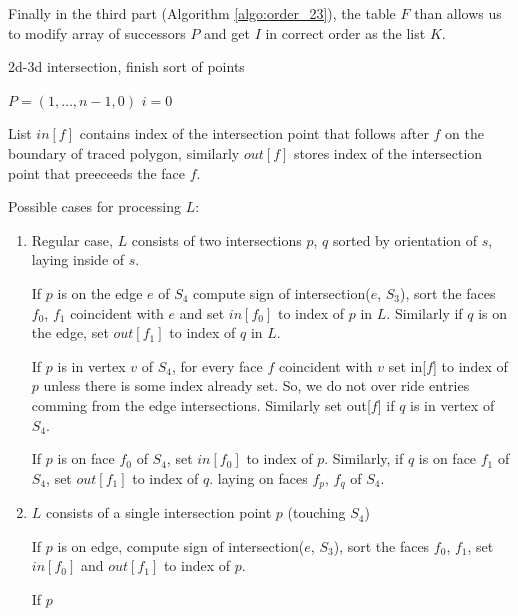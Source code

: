 \documentclass{elsarticle}
\def\abs#1{\left|#1\right|}
\def\abs#1{| #1 |}
\begin{document}
Finally in the third part (Algorithm \ref{algo:order_23}), the table $F$ than allows us to modify array of successors $P$ and get $I$ in correct order as the list $K$.










\begin{algorithm}
  \caption{2d-3d intersection, finish sort of points}  
  \label{algo:order_23}
  
  \DontPrintSemicolon
  $P=(1,\dots, n-1,0)$
  $i=0$\;  
  \lFor{$n=0$ \To $\abs{I}-1$}{
    $K[n]=I[i]$
    $i=P[i]$
  }    
  \label{algo:order_23}
\end{algorithm}

  
 List $in[f]$ contains index of the intersection point that follows after $f$ on the boundary of traced polygon, 
 similarly $out[f]$ stores index of the intersection point that preeceeds the face $f$.

  
Possible cases for processing $L$:
\begin{enumerate}
 \item Regular case, $L$ consists of two intersections $p$, $q$ sorted by orientation of $s$, laying inside of $s$.
 
 If $p$ is on the edge $e$ of $S_4$ compute sign of intersection($e$, $S_3$), sort the faces $f_0$, $f_1$ coincident with $e$
 and set $in[f_0]$ to index of $p$ in $L$. Similarly if $q$ is on the edge, set $out[f_1]$ to index of $q$ in $L$.
 
 If $p$ is in vertex $v$ of $S_4$, for every face $f$ coincident with $v$ set
 in[$f$] to index of $p$ unless there is some index already set. So, we do not over ride
 entries comming from the edge intersections. Similarly set out[$f$] if $q$ is in vertex of $S_4$.
 
 If $p$ is on face $f_0$ of $S_4$, set $in[f_0]$ to index of $p$. Similarly, if $q$ is on face $f_1$ of $S_4$, set $out[f_1]$ to index of $q$.
 laying on faces $f_p$, $f_q$ of $S_4$.
 
 \item $L$ consists of a single intersection point $p$ (touching $S_4$)
 
 
 If $p$ is on edge, compute sign of intersection($e$, $S_3$), sort the faces $f_0$, $f_1$,
 set $in[f_0]$ and $out[f_1]$ to index of $p$.
 
 If $p$
\end{enumerate}
\end{document}
